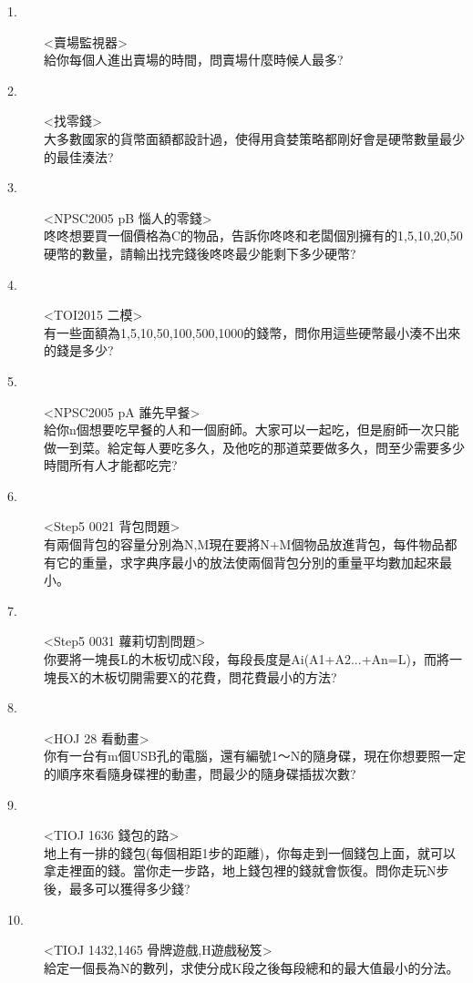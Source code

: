 \documentclass{article}
\begin{document}
\begin{description}
\item[ 1.]<賣場監視器>\\
給你每個人進出賣場的時間，問賣場什麼時候人最多?
\item[ 2.]<找零錢>\\
大多數國家的貨幣面額都設計過，使得用貪婪策略都剛好會是硬幣數量最少的最佳湊法?
\item[ 3.]<NPSC2005 pB 惱人的零錢>\\
咚咚想要買一個價格為C的物品，告訴你咚咚和老闆個別擁有的1,5,10,20,50硬幣的數量，請輸出找完錢後咚咚最少能剩下多少硬幣?
\item[ 4.]<TOI2015 二模>\\
有一些面額為1,5,10,50,100,500,1000的錢幣，問你用這些硬幣最小湊不出來的錢是多少?
\item[ 5.]<NPSC2005 pA 誰先早餐>\\
給你n個想要吃早餐的人和一個廚師。大家可以一起吃，但是廚師一次只能做一到菜。給定每人要吃多久，及他吃的那道菜要做多久，問至少需要多少時間所有人才能都吃完?
\item[ 6.]<Step5 0021 背包問題>\\
有兩個背包的容量分別為N,M現在要將N+M個物品放進背包，每件物品都有它的重量，求字典序最小的放法使兩個背包分別的重量平均數加起來最小。
\item[ 7.]<Step5 0031 蘿莉切割問題>\\
你要將一塊長L的木板切成N段，每段長度是Ai(A1+A2...+An=L)，而將一塊長X的木板切開需要X的花費，問花費最小的方法?
\item[ 8.]<HOJ 28 看動畫>\\
你有一台有m個USB孔的電腦，還有編號1～N的隨身碟，現在你想要照一定的順序來看隨身碟裡的動畫，問最少的隨身碟插拔次數?
\item[ 9.]<TIOJ 1636 錢包的路>\\
地上有一排的錢包(每個相距1步的距離)，你每走到一個錢包上面，就可以拿走裡面的錢。當你走一步路，地上錢包裡的錢就會恢復。問你走玩N步後，最多可以獲得多少錢?
\item[ 10.]<TIOJ 1432,1465 骨牌遊戲,H遊戲秘笈>\\
給定一個長為N的數列，求使分成K段之後每段總和的最大值最小的分法。
\end{description}
\end{document}
